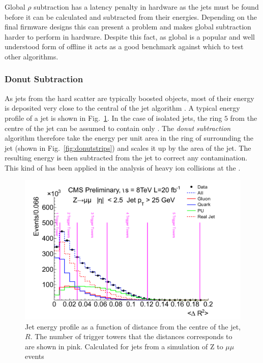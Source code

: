 Global $\rho$ subtraction has a latency penalty in hardware as
the jets must be found before it can be calculated and subtracted from
their energies. Depending on the final firmware designs this can
present a problem and makes global \rho subtraction harder to perform
in hardware. Despite this fact, as global \rho is a popular and well
understood form of offline \PUS it acts as a good benchmark against
which to test other algorithms.

\subsubsection{Donut Subtraction}

As jets from the hard scatter are typically boosted objects, most of
their energy is deposited very close to the central \TT of the jet
algorithm \cite{JetProfile_pileup}. A typical energy profile of a jet
is shown in Fig.~\ref{fig:jetprofile}. In the case of isolated jets,
the ring $5$ \TT from the centre of the jet can be assumed to contain
only \PU.  The \emph{donut subtraction} algorithm therefore take the
energy per unit area in the ring of \TT surrounding the jet (shown in
Fig.~\ref{fig:donutstrips}) and scales
it up by the area of the jet. The resulting energy is then subtracted
from the jet to correct any \PU contamination. This kind of \PUS has
been applied in the analysis of heavy ion collisions at the \LHC
\cite{Cacciari:2010te}.

\begin{figure}
	\begin{center}
		\includegraphics[width=0.8\linewidth]{figs/trigger/jetProfile}
  \caption{ Jet energy profile as a function of distance from the
  centre of the jet, $R$. The number of trigger towers that the
  distances corresponds to are shown in pink. Calculated for jets from
  a simulation of Z to $\mu\mu$ events \cite{JetProfile_pileup}}
	\end{center}
	\label{fig:jetprofile}
\end{figure}

